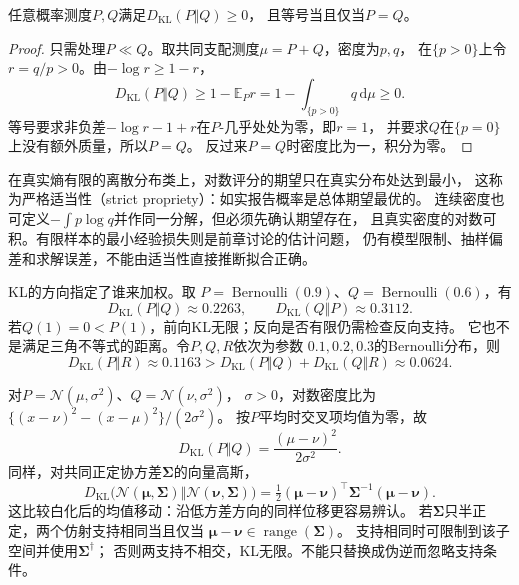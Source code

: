 \begin{theorem}[Gibbs不等式]
\label{thm:information-gibbs-inequality}
任意概率测度\(P,Q\)满足\(D_{\mathrm{KL}}(P\Vert Q)\geq0\)，
且等号当且仅当\(P=Q\)。
\end{theorem}
\begin{proof}
只需处理\(P\ll Q\)。取共同支配测度\(\mu=P+Q\)，密度为\(p,q\)，
在\(\{p>0\}\)上令\(r=q/p>0\)。由\(-\log r\geq1-r\)，
\[
  D_{\mathrm{KL}}(P\Vert Q)
  \geq1-\mathbb E_Pr
  =1-\int_{\{p>0\}}q\,\mathrm d\mu\geq0.
\]
等号要求非负差\(-\log r-1+r\)在\(P\)-几乎处处为零，即\(r=1\)，
并要求\(Q\)在\(\{p=0\}\)上没有额外质量，所以\(P=Q\)。
反过来\(P=Q\)时密度比为一，积分为零。
\end{proof}

在真实熵有限的离散分布类上，对数评分的期望只在真实分布处达到最小，
这称为严格适当性（strict propriety）：如实报告概率是总体期望最优的。
连续密度也可定义\(-\int p\log q\)并作同一分解，但必须先确认期望存在，
且真实密度的对数可积。有限样本的最小经验损失则是前章讨论的估计问题，
仍有模型限制、抽样偏差和求解误差，不能由适当性直接推断拟合正确。

KL的方向指定了谁来加权。取
\(P=\operatorname{Bernoulli}(0.9)\)、\(Q=\operatorname{Bernoulli}(0.6)\)，有
\[
  D_{\mathrm{KL}}(P\Vert Q)\approx0.2263,\qquad
  D_{\mathrm{KL}}(Q\Vert P)\approx0.3112.
\]
若\(Q(1)=0<P(1)\)，前向KL无限；反向是否有限仍需检查反向支持。
它也不是满足三角不等式的距离。令\(P,Q,R\)依次为参数
\(0.1,0.2,0.3\)的Bernoulli分布，则
\[
  D_{\mathrm{KL}}(P\Vert R)\approx0.1163
  >D_{\mathrm{KL}}(P\Vert Q)+D_{\mathrm{KL}}(Q\Vert R)
  \approx0.0624.
\]

对\(P=\mathcal N(\mu,\sigma^2)\)、\(Q=\mathcal N(\nu,\sigma^2)\)，
\(\sigma>0\)，对数密度比为
\(\{(x-\nu)^2-(x-\mu)^2\}/(2\sigma^2)\)。
按\(P\)平均时交叉项均值为零，故
\begin{equation}
  D_{\mathrm{KL}}(P\Vert Q)=\frac{(\mu-\nu)^2}{2\sigma^2}.
  \label{eq:information-gaussian-location-kl}
\end{equation}
同样，对共同正定协方差\(\bm\Sigma\)的向量高斯，
\begin{equation}
  D_{\mathrm{KL}}\bigl(
    \mathcal N(\bm\mu,\bm\Sigma)\Vert\mathcal N(\bm\nu,\bm\Sigma)\bigr)
  =\tfrac12(\bm\mu-\bm\nu)^\top\bm\Sigma^{-1}(\bm\mu-\bm\nu).
  \label{eq:information-vector-gaussian-translation-kl}
\end{equation}
这比较白化后的均值移动：沿低方差方向的同样位移更容易辨认。
若\(\bm\Sigma\)只半正定，两个仿射支持相同当且仅当
\(\bm\mu-\bm\nu\in\operatorname{range}(\bm\Sigma)\)。
支持相同时可限制到该子空间并使用\(\bm\Sigma^\dagger\)；
否则两支持不相交，KL无限。不能只替换成伪逆而忽略支持条件。

